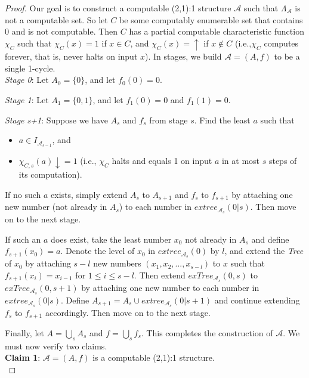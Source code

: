 \documentclass[12pt]{article}
\begin{document}
\begin{proof}
Our goal is to construct a computable (2,1):1 structure $\mathcal{A}$ such that $\Lambda_\mathcal{A}$ is not a computable set. So let $C$ be some computably enumerable set that contains $0$ and is not computable. Then $C$ has a partial computable characteristic function $\chi_C$ such that $\chi_C(x)=1$ if $x \in C$, and $\chi_C(x)=\uparrow$ if $x \not\in C$ (i.e.,$\chi_C$ computes forever, that is, never halts on input $x$). In stages, we build $\mathcal{A}=(A,f)$ to be a single 1-cycle.\\

\emph{Stage 0}: Let $A_0=\{0\}$, and let $f_0(0)=0$.

\emph{Stage 1}: Let $A_1=\{0,1\}$, and let $f_1(0)=0$ and $f_1(1)=0$.

\emph{Stage s+1}: Suppose we have $A_s$ and $f_s$ from stage $s$. Find the least $a$ such that

\begin{itemize}
\item $a \in I_{\mathcal{A}_{s-1}}$, and
\item $\chi_{C,s}(a)\downarrow=1$ (i.e., $\chi_C$ halts and equals 1 on input $a$ in at most $s$ steps of its computation).
\end{itemize}

If no such $a$ exists, simply extend $A_s$ to $A_{s+1}$ and $f_s$ to $f_{s+1}$ by attaching one new number (not already in $A_s$) to each number in $extree_{\mathcal{A}_s}(0|s)$. Then move on to the next stage.

If such an $a$ does exist, take the least number $x_0$ not already in $A_s$ and define $f_{s+1}(x_0)=a$. Denote the level of $x_0$ in $extree_{\mathcal{A}_s}(0)$ by $l$, and extend the \emph{Tree} of $x_0$ by attaching $s-l$ new numbers $(x_1, x_2,...,x_{s-l})$ to $x$ such that $f_{s+1}(x_i)=x_{i-1}$ for $1 \leq i \leq s-l$. Then extend $exTree_{\mathcal{A}_s}(0,s)$ to $exTree_{\mathcal{A}_s}(0,s+1)$ by attaching one new number to each number in $extree_{\mathcal{A}_s}(0|s)$. Define $A_{s+1}=A_s \cup extree_{\mathcal{A}_s}(0|s+1)$ and continue extending $f_s$ to $f_{s+1}$ accordingly. Then move on to the next stage.

Finally, let $A = \bigcup_s A_s$ and $f=\bigcup_s f_s$. This completes the construction of $\mathcal{A}$. We must now verify two claims.\\

\textbf{Claim 1}: $\mathcal{A}=(A,f)$ is a computable (2,1):1 structure.\\


\end{proof}
\end{document}
